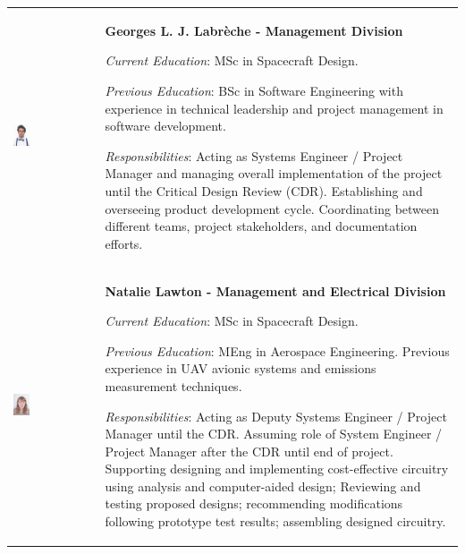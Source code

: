 \documentclass[a4paper,12pt,twoside]{article}
\begin{document}
\begin{longtable}[]{m{} m{}}

 \includegraphics[width=0.2\textwidth]{1-introduction/img/georges-louis-joseph-labreche.jpg}  & \textbf{Georges L. J. Labrèche - Management Division}

\smallskip
\textit{Current Education}: MSc in Spacecraft Design.

\smallskip
\textit{Previous Education}: BSc in Software Engineering with experience in technical leadership and project management in software development.

\smallskip
\textit{Responsibilities}: Acting as Systems Engineer / Project Manager and managing overall implementation of the project until the Critical Design Review (CDR). Establishing and overseeing product development cycle. Coordinating between different teams, project stakeholders, and documentation efforts.                          
\bigskip
\\

\includegraphics[width=0.2\textwidth]{1-introduction/img/natalie-lawton.jpg} & \textbf{Natalie Lawton - Management and Electrical Division}

\smallskip
\textit{Current Education}: MSc in Spacecraft Design.

\smallskip
\textit{Previous Education}: MEng in Aerospace Engineering. Previous experience in UAV avionic systems and emissions measurement techniques.

\smallskip
\textit{Responsibilities}: Acting as Deputy Systems Engineer / Project Manager until the CDR. Assuming role of System Engineer / Project Manager after the CDR until end of project. Supporting designing and implementing cost-effective circuitry using analysis and computer-aided design; Reviewing and testing proposed designs; recommending modifications following prototype test results; assembling designed circuitry. 
\bigskip
\\


\end{longtable}
\end{document}
